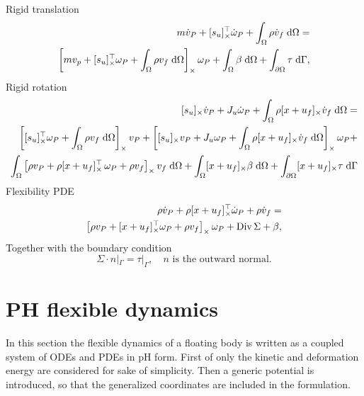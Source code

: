 Rigid translation
\begin{equation}
\label{eq:rig_tr2}
	\begin{split}
	m\dot{{v}}_P + \crmat{s_u}^\top \dot{{\omega}}_P +   \int_{\Omega} \rho \dot{v}_f \d{\Omega}  = \\
	\left[m v_p + \crmat{s_u}^\top \omega_P +\int_{\Omega} \rho v_f \d{\Omega} \right]_\times \omega_P +  \int_{\Omega} \beta \d{\Omega} + \int_{\partial \Omega} \tau \d{\Gamma}, 
	\end{split}
\end{equation}
Rigid rotation
\begin{equation}
\label{eq:rig_rot2}
\begin{split}
\crmat{s_u} \dot{{v}}_P  + J_u \dot{\omega}_P + \int_{\Omega} \rho \crmat{x+u_f} \dot{v}_f \d{\Omega} = \\
\left[\crmat{s_u}^\top \omega_P + \int_{\Omega} \rho {v}_f \d{\Omega} \right]_\times v_P + \left[\crmat{s_u}v_P + J_u \omega_P + \int_{\Omega} \rho \crmat{x+u_f} \dot{v}_f \d{\Omega} \right]_\times \omega_P + 
\\
\int_{\Omega} \left[\rho v_P + \rho \crmat{x+u_f}^\top \, \omega_P + \rho v_f \right]_\times v_f \d{\Omega} + \int_{\Omega}\crmat{x+u_f} \beta \d{\Omega} + \int_{\partial \Omega}\crmat{x+u_f} \tau \d{\Gamma}
\end{split}
\end{equation}
Flexibility PDE
\begin{equation}
\label{eq:flex2}
\begin{split}
\rho \dot{{v}}_P + \rho [x+u_f]_{\times}^\top \dot{\omega}_P  + \rho \dot{v}_f = \\
\left[\rho v_P + [x+u_f]_{\times}^\top \omega_P + \rho v_f \right]_\times \omega_P + \operatorname*{Div}{\Sigma} + \beta,
\end{split}
\end{equation}
Together with the boundary condition
\begin{equation}
\Sigma \cdot n|_\Gamma = \tau|_\Gamma, \quad \text{$n$ is the outward normal.}
\end{equation}

\section{PH flexible dynamics}
\label{sec:pH_fd}
In this section the flexible dynamics of a floating body is written as a coupled system of ODEs and PDEs in pH form. First of only the kinetic and deformation energy are considered for sake of simplicity. Then a generic potential is introduced, so that the generalized coordinates are included in the formulation. 

